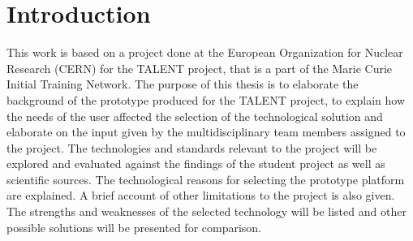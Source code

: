 \documentclass[english,12pt,a4paper,dvips]{article}
\begin{document}
\cleardoublepage
\storeinipagenumber
{}
\setcounter{page}{1}


\section{Introduction}

\thispagestyle{empty}

This work is based on a project done at the European Organization for Nuclear Research (CERN) for the TALENT project, that is a part of the Marie Curie Initial Training Network. The purpose of this thesis is to elaborate the background of the prototype produced for the TALENT project, to explain how the needs of the user affected the selection of the technological solution and elaborate on the input given by the multidisciplinary team members assigned to the project.
The technologies and standards relevant to the project will be explored and evaluated against the findings of the student project as well as scientific sources. The technological reasons for selecting the prototype platform are explained. A brief account of other limitations to the project is also given. The strengths and weaknesses of the selected technology will be listed and other possible solutions will be presented for comparison.


\clearpage
\end{document}
